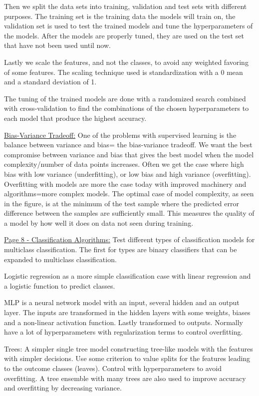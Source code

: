 \documentclass[a4paper, american, 12pt]{report}
\begin{document}
	Then we split the data sets into training, validation and test sets with different purposes. The training set is the training data the models will train on, the validation set is used to test the trained models and tune the hyperparameters of the models. After the models are properly tuned, they are used on the test set that have not been used until now.
	
	Lastly we scale the features, and not the classes, to avoid any weighted favoring of some features. The scaling technique used is standardization with a 0 mean and a standard deviation of 1.
	
	The tuning of the trained models are done with a randomized search combined with cross-validation to find the combinations of the chosen hyperparameters to each model that produce the highest accuracy.
	
	
	\underline{Bias-Variance Tradeoff:}
	One of the problems with supervised learning is the balance between variance and bias= the bias-variance tradeoff. We want the best compromise between variance and bias that gives the best model when the model complexity/number of data points increases. Often we get the case where high bias with low variance (underfitting), or low bias and high variance (overfitting). Overfitting with models are more the case today with improved machinery and algorithms=more complex models. The optimal case of model complexity, as seen in the figure, is at the minimum of the test sample where the predicted error difference between the samples are sufficiently small. This measures the quality of a model by how well it does on data not seen during training.
	
	
	\underline{Page 8 - Classification Algorithms:}
	Test different types of classification models for multiclass classification. The first for types are binary classifiers that can be expanded to multiclass classification.
	
	Logistic regression as a more simple classification case with linear regression and a logistic function to predict classes.
	
	MLP is a neural network model with an input, several hidden and an output layer. The inputs are transformed in the hidden layers with some weights, biases and a non-linear activation function. Lastly transformed to outputs. Normally have a lot of hyperparameters with regularization terms to control overfitting.
	
	Trees: A simpler single tree model constructing tree-like models with the features with simpler decisions. Use some criterion to value splits for the features leading to the outcome classes (leaves). Control with hyperparameters to avoid overfitting. A tree ensemble with many trees are also used to improve accuracy and overfitting by decreasing variance.
	
\end{document}
